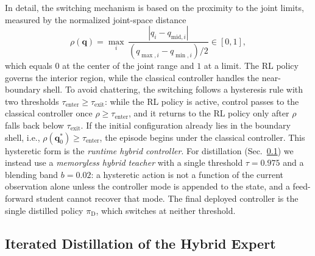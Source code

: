 \documentclass[journal, twoside]{IEEEtran}
\begin{document}
In detail, the switching mechanism is based on the proximity to the joint limits, measured by the normalized joint-space distance
\begin{equation}
\label{eq:rho}
\rho(\mathbf{q}) = \max_{i}\,\frac{|q_{i}-q_{\mathrm{mid},i}|}{(q_{\max,i}-q_{\min,i})/2}\in[0,1],
\end{equation}
which equals $0$ at the center of the joint range and $1$ at a limit. The RL policy governs the interior region, while the classical controller handles the near-boundary shell. To avoid chattering, the switching follows a hysteresis rule with two thresholds $\tau_{\mathrm{enter}}\ge\tau_{\mathrm{exit}}$: while the RL policy is active, control passes to the classical controller once $\rho\ge\tau_{\mathrm{enter}}$, and it returns to the RL policy only after $\rho$ falls back below $\tau_{\mathrm{exit}}$. If the initial configuration already lies in the boundary shell, i.e., $\rho(\mathbf{q}_{0}^{*})\ge\tau_{\mathrm{enter}}$, the episode begins under the classical controller. This hysteretic form is the \emph{runtime hybrid controller}. For distillation (Sec.~\ref{sec:distill}) we instead use a \emph{memoryless hybrid teacher} with a single threshold $\tau{=}0.975$ and a blending band $b{=}0.02$: a hysteretic action is not a function of the current observation alone unless the controller mode is appended to the state, and a feed-forward student cannot recover that mode. The final deployed controller is the single distilled policy $\pi_{\mathrm{D}}$, which switches at neither threshold.


\subsection{Iterated Distillation of the Hybrid Expert}\label{sec:distill}
\end{document}
